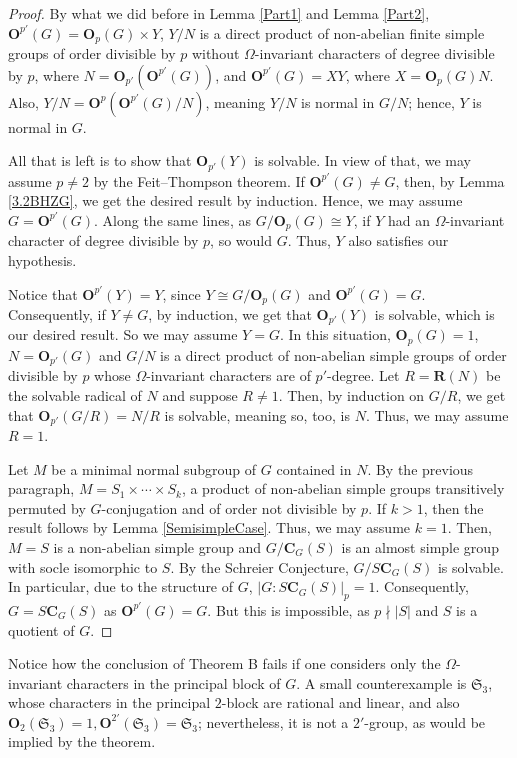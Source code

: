 \documentclass[12pt]{amsart}
\theoremstyle{theorem}
\theoremstyle{definition}
\newcommand{\fS} {\mathfrak S}
\newcommand{\bC} {\mathbf C}
\newcommand{\bO}{{\mathbf O}}
\begin{document}
	\begin{proof}
		By what we did before in Lemma \ref{Part1} and Lemma \ref{Part2}, $\bO^{p'}(G) = \bO_p(G) \times Y$, $Y/N$ is a direct product of non-abelian finite simple groups of order divisible by $p$ without $\Omega$-invariant characters of degree divisible by $p$, where $N = \bO_{p'}(\bO^{p'}(G))$, and $\bO^{p'}(G) = XY$, where $X = \bO_p(G)N$. Also, $Y/N = \bO^p(\bO^{p'}(G)/N)$, meaning $Y/N$ is normal in $G/N$; hence, $Y$ is normal in $G$.
		
		All that is left is to show that $\bO_{p'}(Y)$ is solvable. In view of that, we may assume $p \neq 2$ by the Feit--Thompson theorem. If $\bO^{p'}(G) \neq G$, then, by Lemma \ref{3.2BHZG}, we get the desired result by induction. Hence, we may assume $G = \bO^{p'}(G)$. Along the same lines, as $G/\bO_p(G) \cong Y$, if $Y$ had an $\Omega$-invariant character of degree divisible by $p$, so would $G$. Thus, $Y$ also satisfies our hypothesis.
		
		Notice that $\bO^{p'}(Y) = Y$, since $Y \cong G/\bO_p(G)$ and $\bO^{p'}(G) = G$. Consequently, if $Y \neq G$, by induction, we get that $\bO_{p'}(Y)$ is solvable, which is our desired result. So we may assume $Y = G$. In this situation, $\bO_p(G) = 1$, $N = \bO_{p'}(G)$ and $G/N$ is a direct product of non-abelian simple groups of order divisible by $p$ whose $\Omega$-invariant characters are of $p'$-degree. Let $R = \mathbf{R}(N)$ be the solvable radical of $N$ and suppose $R \neq 1$. Then, by induction on $G/R$, we get that $\bO_{p'}(G/R) = N/R$ is solvable, meaning so, too, is $N$. Thus, we may assume $R = 1$.
		
		Let $M$ be a minimal normal subgroup of $G$ contained in $N$. By the previous paragraph, $M = S_1 \times \cdots \times S_k$, a product of non-abelian simple groups transitively permuted by $G$-conjugation and of order not divisible by $p$. If $k > 1$, then the result follows by Lemma \ref{SemisimpleCase}. Thus, we may assume $k = 1$. Then, $M = S$ is a non-abelian simple group and $G/\bC_G(S)$ is an almost simple group with socle isomorphic to $S$. By the Schreier Conjecture, $G/S\bC_G(S)$ is solvable. In particular, due to the structure of $G$, $|G:S\bC_G(S)|_p = 1$. Consequently, $G = S\bC_G(S)$ as $\bO^{p'}(G) = G$. But this is impossible, as $p \nmid |S|$ and $S$ is a quotient of $G$.
	\end{proof}
	
	Notice how the conclusion of Theorem B fails if one considers only the $\Omega$-invariant characters in the principal block of $G$. A small counterexample is $\fS_3$, whose characters in the principal $2$-block are rational and linear, and also $\bO_2(\fS_3) = 1, \bO^{2'}(\fS_3) = \fS_3$; nevertheless, it is not a $2'$-group, as would be implied by the theorem.
	
\end{document}
